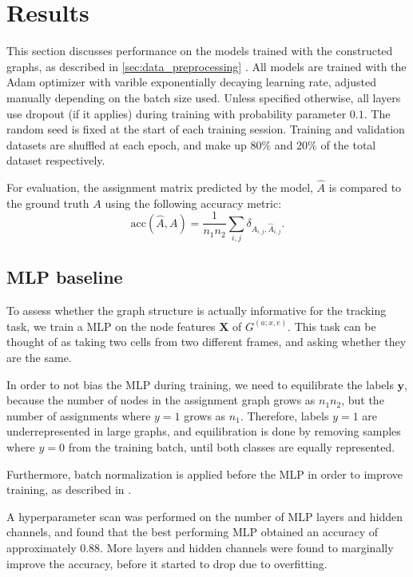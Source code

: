 \documentclass[10pt,conference,compsocconf,a4paper]{IEEEtran}
\renewcommand{\vec}[1]{\boldsymbol{#1}}
\newcommand*{\shortautoref}[1]{%
	\begingroup
	\def\equationautorefname{\textsc{Eq.}}%
	\def\tableautorefname{\textsc{Tab.}}%
	\def\figureautorefname{\textsc{Fig.}}%
	\autoref{#1}%
	\endgroup
}
\begin{document}
\section{Results}

	This section discusses performance on the models trained with the constructed graphs, as described in \shortautoref{sec:data_preprocessing}. All models are trained with the Adam optimizer with varible exponentially decaying learning rate, adjusted manually depending on the batch size used. Unless specified otherwise, all layers use dropout (if it applies) during training with probability parameter $0.1$. The random seed is fixed at the start of each training session. Training and validation datasets are shuffled at each epoch, and make up $80\%$ and $20\%$ of the total dataset respectively.

	For evaluation, the assignment matrix predicted by the model, $\hat A$ is compared to the ground truth $A$ using the following accuracy metric:
	$$
		\textrm{acc}(\hat A, A) = \frac{1}{n_1 n_2} \sum_{i,j} \delta_{A_{i,j}, \hat{A}_{i,j}}.
	$$

	\subsection{MLP baseline}

		To assess whether the graph structure is actually informative for the tracking task, we train a MLP on the node features $\vec{X}$ of $G^{(a;x,e)}$. This task can be thought of as taking two cells from two different frames, and asking whether they are the same.


		In order to not bias the MLP during training, we need to equilibrate the labels $\vec{y}$, because the number of nodes in the assignment graph grows as $n_1 n_2$, but the number of assignments where $y=1$ grows as $n_1$. Therefore, labels $y=1$ are underrepresented in large graphs, and equilibration is done by removing samples where $y=0$ from the training batch, until both classes are equally represented.

		Furthermore, batch normalization is applied before the MLP in order to improve training, as described in \cite{ioffe_batch_2015}.

		A hyperparameter scan was performed on the number of MLP layers and hidden channels, and found that the best performing MLP obtained an accuracy of approximately $0.88$. More layers and hidden channels were found to marginally improve the accuracy, before it started to drop due to overfitting.
\end{document}
